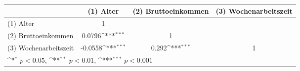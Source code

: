 {
\def\sym#1{\ifmmode^{#1}\else\(^{#1}\)\fi}
\begin{tabular}{l*{3}{c}}
\toprule
                              &(1) Alter         &(2) Bruttoeinkommen         &(3) Wochenarbeitszeit         \\
\midrule
(1) Alter                     &        1         &                  &                  \\
(2) Bruttoeinkommen           &   0.0796\sym{***}&        1         &                  \\
(3) Wochenarbeitszeit         &  -0.0558\sym{***}&    0.292\sym{***}&        1         \\
\bottomrule
\multicolumn{4}{l}{\footnotesize \sym{*} \(p<0.05\), \sym{**} \(p<0.01\), \sym{***} \(p<0.001\)}\\
\end{tabular}
}
